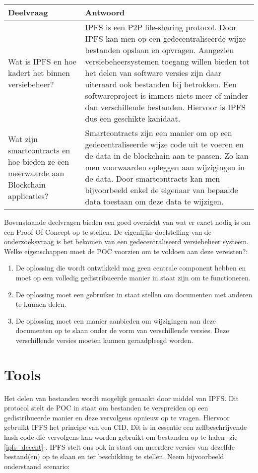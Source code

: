 \begin{table}[t!]
\begin{tabularx}{\linewidth}{ |X|X| }
\hline
Deelvraag & Antwoord \\ \hline
Wat is IPFS en hoe kadert het binnen versiebeheer? & IPFS is een P2P file-sharing protocol. Door IPFS kan men op een gedecentraliseerde wijze bestanden opslaan en opvragen. Aangezien versiebeheersystemen toegang willen bieden tot het delen van software versies zijn daar uiteraard ook bestanden bij betrokken. Een softwareproject is immers niets meer of minder dan verschillende bestanden. Hiervoor is IPFS dus een geschikte kanidaat.\\ \hline
Wat zijn smartcontracts en hoe bieden ze een meerwaarde aan Blockchain applicaties? & Smartcontracts zijn een manier om op een gedecentraliseerde wijze code uit te voeren en de data in de blockchain aan te passen. Zo kan men voorwaarden opleggen aan wijzigingen in de data. Door smartcontracts kan men bijvoorbeeld enkel de eigenaar van bepaalde data toestaan om deze data te wijzigen.\\ \hline
\end{tabularx}
\end{table} 
\newpage
\newpage
Bovenstaande deelvragen bieden een goed overzicht van wat er exact nodig is om een Proof Of Concept op te stellen. De eigenlijke doelstelling van de onderzoeksvraag is het bekomen van een gedecentraliseerd versiebeheer systeem. Welke eigenschappen moet de POC voorzien om te voldoen aan deze vereisten?:

\begin{enumerate}
	\item De oplossing die wordt ontwikkeld mag geen centrale component hebben en moet op een volledig gedistribueerde manier in staat zijn om te functioneren.
	\item De oplossing moet een gebruiker in staat stellen om documenten met anderen te kunnen delen.
	\item De oplossing moet een manier aanbieden om wijzigingen aan deze documenten op te slaan onder de vorm van verschillende versies. Deze verschillende versies moeten kunnen geraadpleegd worden.
\end{enumerate}

\section{Tools}
\label{Tools}
Het delen van bestanden wordt mogelijk gemaakt door middel van IPFS. Dit protocol stelt de POC in staat om bestanden te verspreiden op een gedistribueerde manier en deze vervolgens opnieuw op te vragen. Hiervoor gebruikt IPFS het principe van een CID. Dit is in essentie een zelfbeschrijvende hash code die vervolgens kan worden gebruikt om bestanden op te halen -zie \ref{ipfs_decent}-. IPFS stelt ons ook in staat om meerdere versies van dezelfde bestand(en) op te slaan en ter beschikking te stellen. Neem bijvoorbeeld onderstaand scenario:\\


